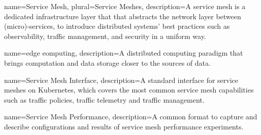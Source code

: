 




\makeglossaries












{
    name={Service Mesh},
    plural={Service Meshes},
    description={A service mesh is a dedicated infrastructure layer that that abstracts the network layer between (micro)-services, to introduce distributed systems' best practices such as observability, traffic management, and security in a uniform way.}
}

{
    name={edge eomputing},
    description={A distributed computing paradigm that brings computation and data storage closer to the sources of data.}
}

{
    name={Service Mesh Interface},
    description={A standard interface for service meshes on Kubernetes, which covers the most common service mesh capabilities such as traffic policies, traffic telemetry and traffic management.}
}

{
    name={Service Mesh Performance},
    description={A common format to capture and describe configurations and results of service mesh performance experiments.}
}



